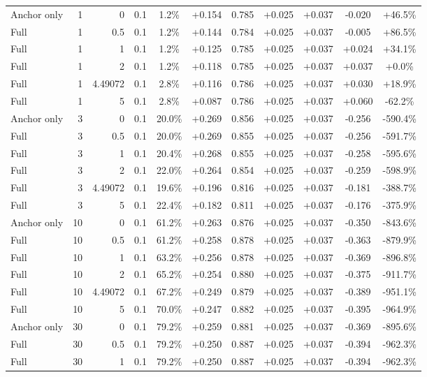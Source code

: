 \begin{table}[htbp]
\begin{tabular}{lrrrccccccc}
Anchor only & 1 & 0 & 0.1 & 1.2\% & +0.154 & 0.785 & +0.025 & +0.037 & -0.020 & +46.5\% \\
Full & 1 & 0.5 & 0.1 & 1.2\% & +0.144 & 0.784 & +0.025 & +0.037 & -0.005 & +86.5\% \\
Full & 1 & 1 & 0.1 & 1.2\% & +0.125 & 0.785 & +0.025 & +0.037 & +0.024 & +34.1\% \\
Full & 1 & 2 & 0.1 & 1.2\% & +0.118 & 0.785 & +0.025 & +0.037 & +0.037 & +0.0\% \\
Full & 1 & 4.49072 & 0.1 & 2.8\% & +0.116 & 0.786 & +0.025 & +0.037 & +0.030 & +18.9\% \\
Full & 1 & 5 & 0.1 & 2.8\% & +0.087 & 0.786 & +0.025 & +0.037 & +0.060 & -62.2\% \\
Anchor only & 3 & 0 & 0.1 & 20.0\% & +0.269 & 0.856 & +0.025 & +0.037 & -0.256 & -590.4\% \\
Full & 3 & 0.5 & 0.1 & 20.0\% & +0.269 & 0.855 & +0.025 & +0.037 & -0.256 & -591.7\% \\
Full & 3 & 1 & 0.1 & 20.4\% & +0.268 & 0.855 & +0.025 & +0.037 & -0.258 & -595.6\% \\
Full & 3 & 2 & 0.1 & 22.0\% & +0.264 & 0.854 & +0.025 & +0.037 & -0.259 & -598.9\% \\
Full & 3 & 4.49072 & 0.1 & 19.6\% & +0.196 & 0.816 & +0.025 & +0.037 & -0.181 & -388.7\% \\
Full & 3 & 5 & 0.1 & 22.4\% & +0.182 & 0.811 & +0.025 & +0.037 & -0.176 & -375.9\% \\
Anchor only & 10 & 0 & 0.1 & 61.2\% & +0.263 & 0.876 & +0.025 & +0.037 & -0.350 & -843.6\% \\
Full & 10 & 0.5 & 0.1 & 61.2\% & +0.258 & 0.878 & +0.025 & +0.037 & -0.363 & -879.9\% \\
Full & 10 & 1 & 0.1 & 63.2\% & +0.256 & 0.878 & +0.025 & +0.037 & -0.369 & -896.8\% \\
Full & 10 & 2 & 0.1 & 65.2\% & +0.254 & 0.880 & +0.025 & +0.037 & -0.375 & -911.7\% \\
Full & 10 & 4.49072 & 0.1 & 67.2\% & +0.249 & 0.879 & +0.025 & +0.037 & -0.389 & -951.1\% \\
Full & 10 & 5 & 0.1 & 70.0\% & +0.247 & 0.882 & +0.025 & +0.037 & -0.395 & -964.9\% \\
Anchor only & 30 & 0 & 0.1 & 79.2\% & +0.259 & 0.881 & +0.025 & +0.037 & -0.369 & -895.6\% \\
Full & 30 & 0.5 & 0.1 & 79.2\% & +0.250 & 0.887 & +0.025 & +0.037 & -0.394 & -962.3\% \\
Full & 30 & 1 & 0.1 & 79.2\% & +0.250 & 0.887 & +0.025 & +0.037 & -0.394 & -962.3\% \\

\end{tabular}
\end{table}
